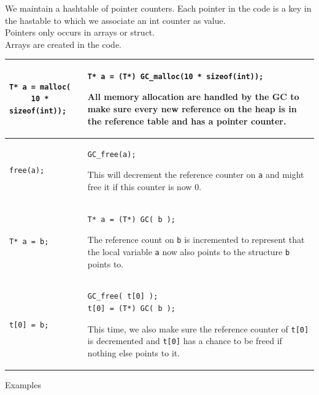 \documentclass[12pt,a4paper,titlepage]{article}
\newcommand{\cl}[1]{\texttt{#1}}
\begin{document}
We maintain a hashtable of pointer counters.
Each pointer in the code is a key in the hastable to which we associate an int counter as value.\\

Pointers only occurs in arrays or struct.\\

Arrays are created in the code.\\

\begin{tabular}{|p{5cm}|p{11cm}|}
\hline
\begin{lstlisting}
T* a = malloc(
     10 * sizeof(int));
\end{lstlisting} & \begin{lstlisting}
T* a = (T*) GC_malloc(10 * sizeof(int));
\end{lstlisting}
All memory allocation are handled by the GC to make sure every new reference on the heap is in the reference table and has a pointer counter.
\\ \hline
\begin{lstlisting}
free(a);
\end{lstlisting} & \begin{lstlisting}
GC_free(a);
\end{lstlisting}
This will decrement the reference counter on \cl{a} and might free it if this counter is now 0. \\ \hline
\begin{lstlisting}
T* a = b;
\end{lstlisting} & \begin{lstlisting}
T* a = (T*) GC( b );
\end{lstlisting}
The reference count on \cl{b} is incremented to represent that the local variable \cl{a} now also points to the structure \cl{b} points to.\\ \hline
\begin{lstlisting}
t[0] = b;
\end{lstlisting} & \begin{lstlisting}
GC_free( t[0] );
t[0] = (T*) GC( b );
\end{lstlisting}
This time, we also make sure the reference counter of \cl{t[0]} is decremented and \cl{t[0]} has a chance to be freed if nothing else points to it.\\ \hline
\end{tabular}





Examples
\end{document}
